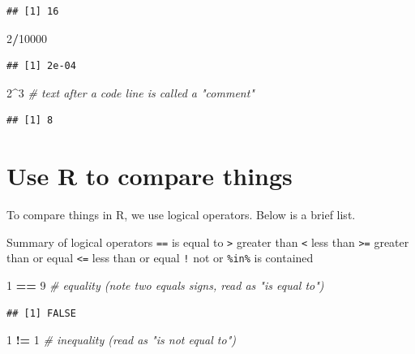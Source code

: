 \documentclass[
]{book}
\newenvironment{Shaded}{\begin{snugshade}}{\end{snugshade}}
\newcommand{\CommentTok}[1]{\textcolor[rgb]{0.56,0.35,0.01}{\textit{#1}}}
\newcommand{\DecValTok}[1]{\textcolor[rgb]{0.00,0.00,0.81}{#1}}
\newcommand{\SpecialCharTok}[1]{\textcolor[rgb]{0.81,0.36,0.00}{\textbf{#1}}}
\begin{document}
\begin{verbatim}
## [1] 16
\end{verbatim}

\begin{Shaded}
\begin{Highlighting}[]
\DecValTok{2}\SpecialCharTok{/}\DecValTok{10000} 
\end{Highlighting}
\end{Shaded}

\begin{verbatim}
## [1] 2e-04
\end{verbatim}

\begin{Shaded}
\begin{Highlighting}[]
\DecValTok{2}\SpecialCharTok{\^{}}\DecValTok{3} \CommentTok{\# text after a code line is called a "comment"}
\end{Highlighting}
\end{Shaded}

\begin{verbatim}
## [1] 8
\end{verbatim}

\section{Use R to compare things}\label{use-r-to-compare-things}

To compare things in R, we use logical operators. Below is a brief list.

Summary of logical operators
\texttt{==} is equal to
\texttt{\textgreater{}} greater than
\texttt{\textless{}} less than
\texttt{\textgreater{}=} greater than or equal
\texttt{\textless{}=} less than or equal
\texttt{!} not
\texttt{\textbar{}} or
\texttt{\%in\%} is contained

\begin{Shaded}
\begin{Highlighting}[]
\DecValTok{1} \SpecialCharTok{==} \DecValTok{9}  \CommentTok{\# equality (note two equals signs, read as "is equal to")}
\end{Highlighting}
\end{Shaded}

\begin{verbatim}
## [1] FALSE
\end{verbatim}

\begin{Shaded}
\begin{Highlighting}[]
\DecValTok{1} \SpecialCharTok{!=} \DecValTok{1}  \CommentTok{\# inequality (read as "is not equal to")}
\end{Highlighting}
\end{Shaded}
\end{document}
